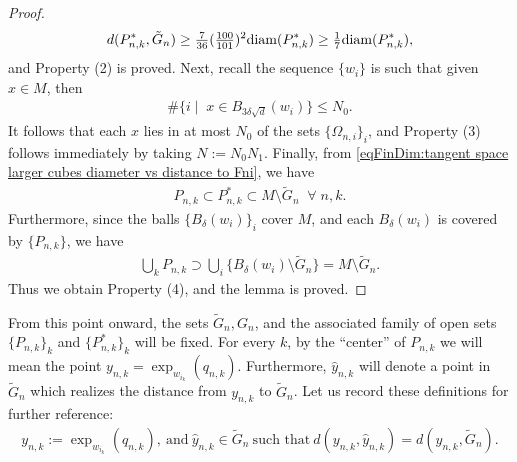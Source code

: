 \documentclass[11pt,reqno]{amsart}
\numberwithin{equation}{section}
\theoremstyle{plain}
\def\diam{\textnormal{diam}}
\begin{document}
\begin{proof}
\begin{align*}
      d(P_{n,k}^*,\tilde G_n) \geq \tfrac{7}{36}(\tfrac{100}{101})^2\diam(P_{n,k}^*) \geq \tfrac{1}{7}\diam(P_{n,k}^*) ,
    \end{align*}			
    and Property (2) is proved.  Next, recall the sequence $\{w_i\}$ is such that given $x \in M$, then
    \begin{align*}	
      \#\{ i \mid\;x\in B_{3\delta\sqrt{d}}(w_i)\}\leq N_0. 
    \end{align*}
       It follows that each $x$ lies in at most $N_0$ of the sets $\{\Omega_{n,i}\}_i$, and Property (3) follows immediately by taking $N:=N_0N_1$. Finally, from \eqref{eqFinDim:tangent space larger cubes diameter vs distance to Fni}, we have
       \begin{align*}	
         P_{n,k}\subset P_{n,k}^* \subset M \setminus \tilde G_n\;\;\forall\;n,k.	
       \end{align*}	
       Furthermore, since the balls $\{B_{\delta}(w_i)\}_i$ cover $M$, and each $B_{\delta}(w_i)$ is covered by $\{P_{n,k}\}$, we have
       \begin{align*}	
         \bigcup \limits_{k} P_{n,k} \supset \bigcup\limits_{i} \{ B_{\delta}(w_i)\setminus \tilde G_n \}  = M \setminus \tilde G_n.			
       \end{align*}
       Thus we obtain Property (4), and the lemma is proved.
  \end{proof}
  
  From this point onward, the sets $\tilde G_n,G_n$, and the associated family of open sets $\{P_{n,k}\}_k$ and $\{P_{n,k}^*\}_k$ will be fixed. For every $k$,  by the ``center'' of $P_{n,k}$ we will mean the point $y_{n,k} = \exp_{w_{i_k}}(q_{n,k})$. Furthermore, $\hat y_{n,k}$ will denote a point in $\tilde G_n$ which realizes the distance from $y_{n,k}$ to $\tilde G_n$.  Let us record these definitions for further reference:
  \begin{align}\label{eqWhitney:DefOfYnkHat}
    y_{n,k} := \exp_{w_{i_k}}(q_{n,k}),\ \text{and}\ \hat y_{n,k}\in \tilde G_n\ \text{such that}\     d(y_{n,k},\hat y_{n,k}) = d(y_{n,k}, \tilde G_n).  
  \end{align}
\end{document}
